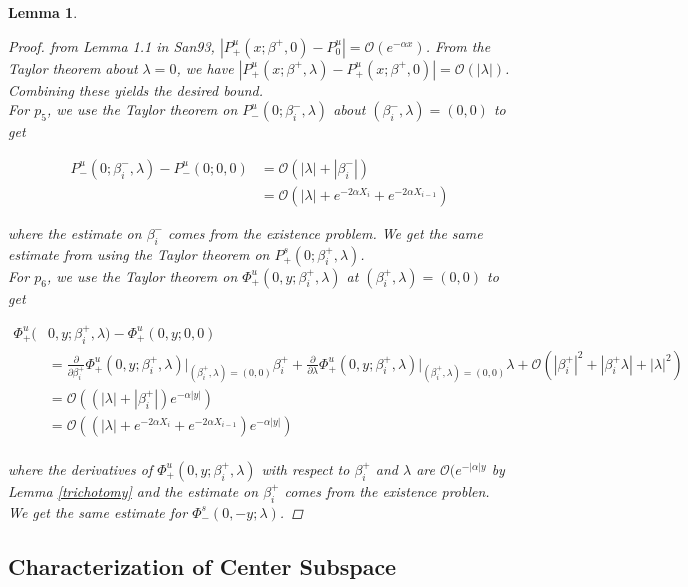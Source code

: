 \documentclass[12pt]{article}
\newtheorem{lemma}{Lemma}
\begin{document}
\begin{lemma}
\begin{proof}
from Lemma 1.1 in San93, $|P^u_+(x; \beta^+, 0) - P_0^u| = \mathcal{O}(e^{-\alpha x})$. From the Taylor theorem about $\lambda = 0$, we have $|P^u_+(x; \beta^+, \lambda) - P^u_+(x; \beta^+, 0)| = \mathcal{O}(|\lambda|)$. Combining these yields the desired bound.\\

For $p_5$, we use the Taylor theorem on $P^u_-(0; \beta_i^-, \lambda)$ about $(\beta_i^-, \lambda) = (0, 0)$ to get 

\begin{align*}
P^u_-(0; \beta_i^-, \lambda) - P^u_-(0; 0, 0) &= \mathcal{O}(|\lambda| + |\beta_i^-|) \\
&= \mathcal{O}(|\lambda| + e^{-2 \alpha X_i} + e^{-2 \alpha X_{i-1}})
\end{align*}

where the estimate on $\beta_i^-$ comes from the existence problem. We get the same estimate from using the Taylor theorem on $P^s_+(0; \beta_i^+, \lambda)$.\\

For $p_6$, we use the Taylor theorem on $\Phi^u_+(0, y; \beta_i^+, \lambda)$ at $(\beta_i^+, \lambda) = (0, 0)$ to get 

\begin{align*}
\Phi^u_+(&0, y; \beta_i^+, \lambda) - \Phi^u_+(0, y; 0, 0) \\
&= \frac{\partial}{\partial \beta_i^+}\Phi^u_+(0, y; \beta_i^+, \lambda)\Big|_{(\beta_i^+, \lambda) = (0, 0)} \beta_i^+ + \frac{\partial}{\partial \lambda}\Phi^u_+(0, y; \beta_i^+, \lambda)\Big|_{(\beta_i^+, \lambda) = (0, 0)} \lambda + \mathcal{O}(|\beta_i^+|^2 + |\beta_i^+ \lambda| + |\lambda|^2) \\
&= \mathcal{O}((|\lambda| + |\beta_i^+|)e^{-\alpha |y| }) \\
&= \mathcal{O}((|\lambda| + e^{-2 \alpha X_i} + e^{-2 \alpha X_{i-1}})e^{-\alpha |y| }) \\
\end{align*}

where the derivatives of $\Phi^u_+(0, y; \beta_i^+, \lambda)$ with respect to $\beta_i^+$ and $\lambda$ are $\mathcal{O}(e^{-|\alpha|y}$ by Lemma \ref{trichotomy} and the estimate on $\beta_i^+$ comes from the existence problen. We get the same estimate for $\Phi^s_-(0, -y; \lambda)$.

\end{proof}
\end{lemma}


\subsection{Characterization of Center Subspace}
\end{document}
